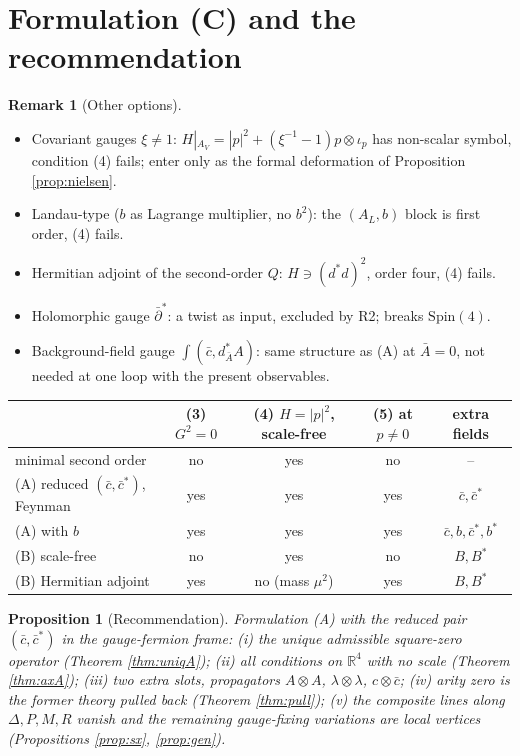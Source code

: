 \documentclass[11pt]{article}
\theoremstyle{plain}
\newtheorem{proposition}[theorem]{Proposition}
\theoremstyle{definition}
\newtheorem{remark}[theorem]{Remark}
\numberwithin{equation}{section}
\begin{document}
\section{Formulation (C) and the recommendation}

\begin{remark}[Other options]
\begin{itemize}
\item Covariant gauges $\xi\neq1$: $H|_{A_V}=|p|^2+(\xi^{-1}-1)p\otimes\iota_p$ has non-scalar symbol, condition (4) fails; enter only as the formal deformation of Proposition \ref{prop:nielsen}.
\item Landau-type ($b$ as Lagrange multiplier, no $b^2$): the $(A_L,b)$ block is first order, (4) fails.
\item Hermitian adjoint of the second-order $Q$: $H\ni(d^*d)^2$, order four, (4) fails.
\item Holomorphic gauge $\bar\partial^*$: a twist as input, excluded by R2; breaks $\mathrm{Spin}(4)$.
\item Background-field gauge $\int(\bar c,d_{\bar A}^*A)$: same structure as (A) at $\bar A=0$, not needed at one loop with the present observables.
\end{itemize}
\end{remark}

\begin{tabular}{l|c|c|c|c}
\toprule
 & (3) $G^2=0$ & (4) $H=|p|^2$, scale-free & (5) at $p\neq0$ & extra fields \\
\midrule
minimal second order & no & yes & no & -- \\
(A) reduced $(\bar c,\bar c^*)$, Feynman & yes & yes & yes & $\bar c,\bar c^*$ \\
(A) with $b$ & yes & yes & yes & $\bar c,b,\bar c^*,b^*$ \\
(B) scale-free & no & yes & no & $B,B^*$ \\
(B) Hermitian adjoint & yes & no (mass $\mu^2$) & yes & $B,B^*$ \\
\bottomrule
\end{tabular}

\begin{proposition}[Recommendation]
Formulation (A) with the reduced pair $(\bar c,\bar c^*)$ in the gauge-fermion frame: (i) the unique admissible square-zero operator (Theorem \ref{thm:uniqA}); (ii) all conditions on $\mathbb R^4$ with no scale (Theorem \ref{thm:axA}); (iii) two extra slots, propagators $A\otimes A$, $\lambda\otimes\lambda$, $c\otimes\bar c$; (iv) arity zero is the former theory pulled back (Theorem \ref{thm:pull}); (v) the composite lines along $\Delta,P,M,R$ vanish and the remaining gauge-fixing variations are local vertices (Propositions \ref{prop:sx}, \ref{prop:gen}).
\end{proposition}
\end{document}
